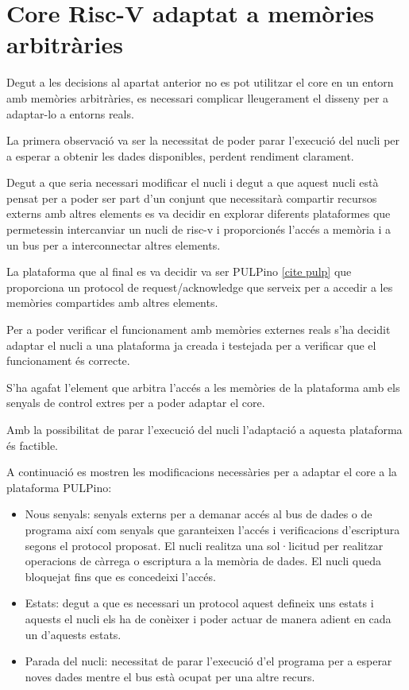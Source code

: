 \documentclass[10pt,a4paper,twocolumn,twoside]{article}
\begin{document}
        
        
\section{Core Risc-V adaptat a memòries arbitràries}
    Degut a les decisions al apartat anterior no es pot utilitzar el core en un entorn amb memòries arbitràries, es necessari complicar lleugerament el disseny per a adaptar-lo a entorns reals. 
    
    La primera observació va ser la necessitat de poder parar l'execució del nucli per a esperar a obtenir les dades disponibles, perdent rendiment clarament.
    
    Degut a que seria necessari modificar el nucli i degut a que aquest nucli està pensat per a poder ser part d'un conjunt que necessitarà compartir recursos externs amb altres elements es va decidir en explorar diferents plataformes que permetessin intercanviar un nucli de risc-v i proporcionés l'accés a memòria i a un bus per a interconnectar altres elements.
    
    La plataforma que al final es va decidir va ser PULPino \ref{cite pulp} que proporciona un protocol de request/acknowledge que serveix per a accedir a les memòries compartides amb altres elements. 
    
    Per a poder verificar el funcionament amb memòries externes reals s'ha decidit adaptar el nucli a una plataforma ja creada i testejada per a verificar que el funcionament és correcte.
    
    S'ha agafat l'element que arbitra l'accés a les memòries de la plataforma amb els senyals de control extres per a poder adaptar el core.
    
    Amb la possibilitat de parar l'execució del nucli l'adaptació a aquesta plataforma és factible.
    
    A continuació es mostren les modificacions necessàries per a adaptar el core a la plataforma PULPino:
    \begin{itemize}
        \item Nous senyals: senyals externs per a demanar accés al bus de dades o de programa així com senyals que garanteixen l'accés i verificacions d'escriptura segons el protocol proposat. El nucli realitza una sol·licitud per realitzar operacions de càrrega o escriptura a la memòria de dades. El nucli queda bloquejat fins que es concedeixi l’accés.
        \item Estats: degut a que es necessari un protocol aquest defineix uns estats i aquests el nucli els ha de conèixer i poder actuar de manera adient en cada un d'aquests estats. 
        \item Parada del nucli:  necessitat de parar l'execució d'el programa per a esperar noves dades mentre el bus està ocupat per una altre recurs.

    \end{itemize}
    
\end{document}
